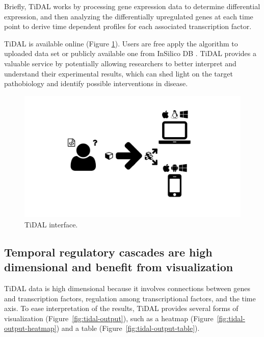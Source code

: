 Briefly, TiDAL works by processing gene expression data to determine differential expression, and then analyzing the differentially upregulated genes at each time point to derive time dependent profiles for each associated transcription factor.

TiDAL is available online (Figure \ref{fig:tidal-landing}). 
Users are free apply the algorithm to uploaded data set or publicly available one from InSilico DB \autocite{coletta2012insilico}.
TiDAL provides a valuable service by potentially allowing researchers to better interpret and understand their experimental results, which can shed light on the target pathobiology and identify possible interventions in disease.

\begin{figure}
  \centering
  \includegraphics[width=\textwidth, page=17, trim=0.37cm .65cm 0.37cm 0.3cm, clip=true]{images/Figures.pdf}
  \caption{TiDAL interface.}
  \label{fig:tidal-landing}
\end{figure}







\subsection{Temporal regulatory cascades are high dimensional and benefit from visualization}

TiDAL data is high dimensional because it involves connections between genes  and transcription factors, regulation among transcriptional factors, and the time axis.
To ease interpretation of the results, TiDAL provides several forms of visualization (Figure~\ref{fig:tidal-output}), such as a heatmap (Figure~\ref{fig:tidal-output-heatmap}) and a table (Figure~\ref{fig:tidal-output-table}).

